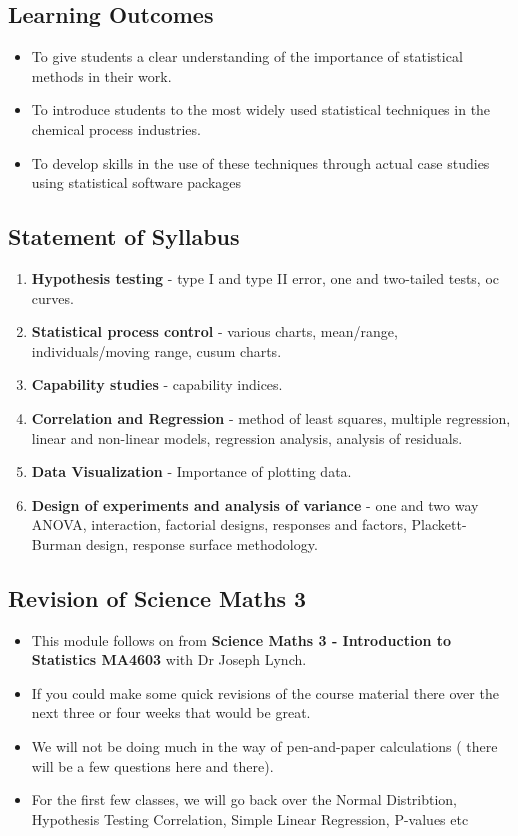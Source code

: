 \documentclass[12pt, a4paper]{article}
\begin{document}
\newpage
\subsection{Learning Outcomes}
\begin{itemize}
	\item To give students a clear understanding of the importance of statistical methods in their work.
	\item To introduce students to the most widely used statistical techniques in the chemical process industries.
	\item To develop skills in the use of these techniques through actual case studies using statistical software packages
\end{itemize}


\subsection{Statement of Syllabus}
\begin{enumerate}
	\item \textbf{Hypothesis testing} - type I  and type II error, one and two-tailed tests, oc curves.
	\item \textbf{Statistical process control} - various charts, mean/range, individuals/moving range, cusum charts.
	\item \textbf{Capability studies} - capability indices.
	\item \textbf{Correlation and Regression} - method of least squares, multiple regression, linear and non-linear models, regression analysis, analysis of residuals.
	\item \textbf{Data Visualization} - Importance of plotting data.
	\item \textbf{Design of experiments and analysis of variance} - one and two way ANOVA, interaction, factorial designs, responses and factors, Plackett-Burman design, response surface methodology.
\end{enumerate}
\newpage

\subsection{Revision of Science Maths 3}
\begin{itemize}
\item This module follows on from \textbf{Science Maths 3  - Introduction to Statistics MA4603} with Dr Joseph Lynch. 
\item If you could make some quick revisions of the course material there over the next three or four weeks that would be great.
\item We will not be doing much in the way of pen-and-paper calculations ( there will be a few questions here and there). 

\item For the first few classes, we will go back over the Normal Distribtion, Hypothesis Testing Correlation, Simple Linear Regression, P-values etc

\end{itemize}
\end{document}
